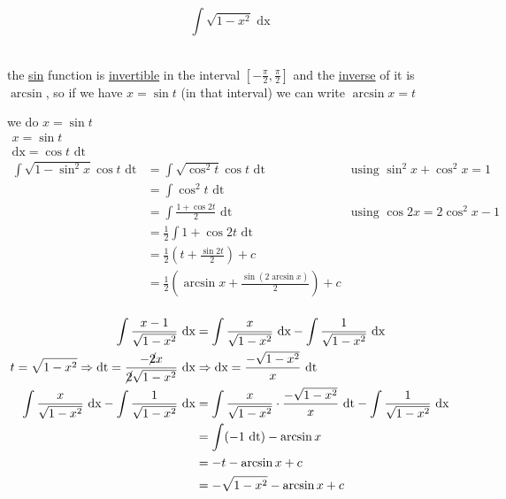 \documentclass[a4paper,12pt]{article}
\newcommand{\?}{\stackrel{?}{=}}
\begin{document}
\begin{definition}
\begin{my_example}
\[
  \int \sqrt{1 - x^2} \text{ dx}
\]\\[0pt]
\begin{note}
the \hyperref[sec:org53499b5]{sin} function is \href{discrete_maths2.org}{invertible} in the interval \([-\frac{\pi}{2}, \frac{\pi}{2}]\) and the \href{discrete_maths2.org}{inverse} of it is \(\arcsin\), so if we have \(x = \sin t\) (in that interval) we can write \(\arcsin x = t\)\\[0pt]
\end{note}
we do \(x = \sin t\)\\[0pt]
\begin{align*}
  x = \sin t\\
  \text{dx} = \cos t \text{ dt}\\
  \int \sqrt{1 - \sin^2 x} \cos t \text{ dt} &= \int \sqrt{\cos^2 t} \cos t \text{ dt} &\text{using } \sin^2{x} + \cos^2{x} = 1\\
  &= \int \cos^2 t \text{ dt}\\
  &= \int \frac{1 + \cos 2t}{2} \text{ dt} &\text{using } \cos 2x = 2\cos^2 x - 1\\
  &= \frac12 \int 1 + \cos 2t \text{ dt}\\
  &= \frac12 \left(t + \frac{\sin 2t}{2}\right) + c\\
  &= \frac12 \left(\arcsin x + \frac{\sin(2\arcsin x)}{2}\right) + c\\
\end{align*}
\end{my_example}

\begin{my_example}
\begin{align*}
  \int \frac{x - 1}{\sqrt{1 - x^2}} \text{ dx} &= \int \frac{x}{\sqrt{1-x^2}} \text{ dx} - \int \frac{1}{\sqrt{1-x^2}} \text{ dx}\\
  t = \sqrt{1 - x^2} \Rightarrow \text{dt} = \frac{-\cancel{2}x}{\cancel{2}\sqrt{1-x^2}} \text{ dx} &\Rightarrow \text{dx} = \frac{-\sqrt{1-x^2}}{x} \text{ dt}\\
  \int \frac{x}{\sqrt{1-x^2}} \text{ dx} - \int \frac{1}{\sqrt{1-x^2}} \text{ dx} &= \int \frac{x}{\sqrt{1-x^2}} \cdot \frac{-\sqrt{1-x^2}}{x} \text{ dt} - \int \frac{1}{\sqrt{1-x^2}} \text{ dx}\\
  &= \int (-1 \text{ dt}) - \arcsin x\\
  &= -t - \arcsin x + c\\
  &= -\sqrt{1 - x^2} - \arcsin x + c\\
\end{align*}
\end{my_example}


\end{definition}
\end{document}
